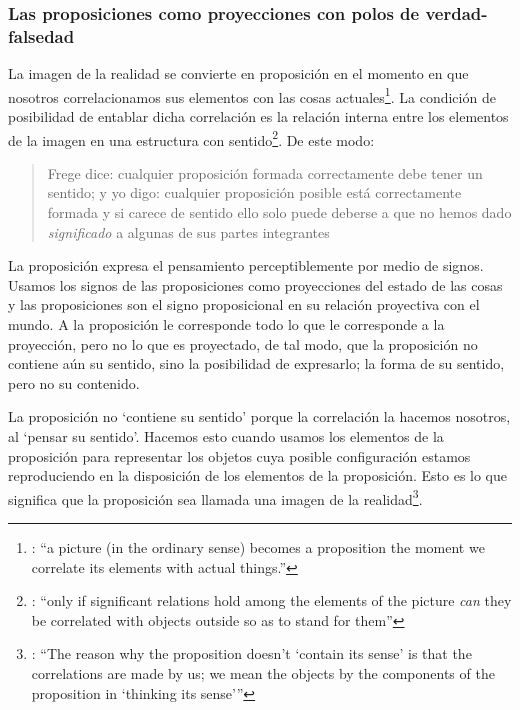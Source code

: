 \subsubsection{Las proposiciones como proyecciones con polos de verdad-falsedad}

La imagen de la realidad se convierte en proposición en el momento en que nosotros correlacionamos sus elementos con las cosas actuales\footnote{\cite[Cf.~][73]{anscombe1959iwt}: \enquote{a picture (in the ordinary sense) becomes a proposition the moment we correlate its elements with actual things.}}. La condición de posibilidad de entablar dicha correlación es la relación interna entre los elementos de la imagen en una estructura con sentido\footnote{\cite[Cf.~][68]{anscombe1959iwt}: \enquote{only if significant relations hold among the elements of the picture \emph{can} they be correlated with objects outside so as to stand for them}}. De este modo: \blockquote[{\cite[\S5.4733]{wittgenstein1922tractatuses}}]{Frege dice: cualquier proposición formada correctamente debe tener un sentido; y yo digo: cualquier proposición posible está correctamente formada y si carece de sentido ello solo puede deberse a que no hemos dado \emph{significado} a algunas de sus partes integrantes}.

La proposición expresa el pensamiento perceptiblemente por medio de signos. Usamos los signos de las proposiciones como proyecciones del estado de las cosas y las proposiciones son el signo proposicional en su relación proyectiva con el mundo. A la proposición le corresponde todo lo que le corresponde a la proyección, pero no lo que es proyectado, de tal modo, que la proposición no contiene aún su sentido, sino la posibilidad de expresarlo; la forma de su sentido, pero no su contenido\autocite[Cf.~][\S3.1, \S3.11-\S3.13]{wittgenstein1922tractatuses}.

La proposición no `contiene su sentido' porque la correlación la hacemos nosotros, al `pensar su sentido'. Hacemos esto cuando usamos los elementos de la proposición para representar los objetos cuya posible configuración estamos reproduciendo en la disposición de los elementos de la proposición. Esto es lo que significa que la proposición sea llamada una imagen de la realidad\footnote{\cite[cf.~][69]{anscombe1959iwt}: \enquote{The reason why the proposition doesn't `contain its sense' is that the correlations are made by us; we mean the objects by the components of the proposition in `thinking its sense'}}.

